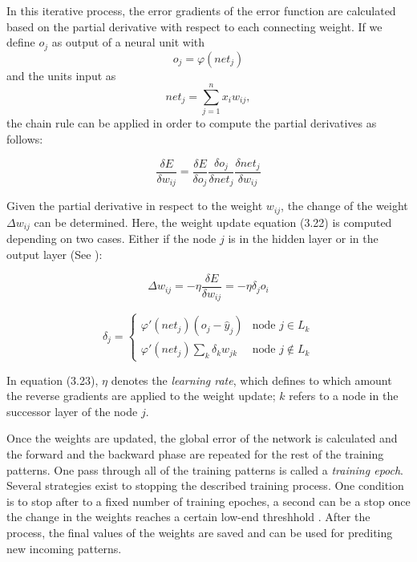 In this iterative process, the error gradients of the error function are calculated based on the partial derivative with respect to each connecting weight. If we define $o_j$ as output of a neural unit with
\begin{equation}
  o_j = \varphi(net_j)
\end{equation}
and the units input as
\begin{equation}
  net_j = \sum_{j=1}^{n}x_{i}w_{ij},
\end{equation}
the chain rule can be applied in order to compute the partial derivatives as follows:

\begin{equation}
  \frac{\delta E}{\delta w_{ij}} = \frac{\delta E}{\delta o_j} \frac{\delta o_j}{\delta net_j} \frac{\delta net_j}{\delta w_{ij}}
\end{equation}

Given the partial derivative in respect to the weight $w_{ij}$, the change of the weight $\Delta w_{ij}$ can be determined. Here, the weight update equation (3.22) is computed depending on two cases. Either if the node $j$ is in the hidden layer or in the output layer (See \cite{Mitchell:1997:ML:541177}):

\begin{equation}
  \Delta w_{ij} = -\eta \frac{\delta E}{\delta w_{ij}} = - \eta \delta_j o_i
\end{equation}

\begin{equation}
  \delta_j =
  \begin{cases}
    \varphi'(net_j)(o_j - \hat{y}_j) & \text{node $j \in L_k$}\\
    \varphi'(net_j) \sum_k \delta_k w_{jk} & \text{node $j \notin L_k$}
  \end{cases}
\end{equation}

In equation (3.23), $\eta$ denotes the \textit{learning rate}, which defines to which amount the reverse gradients are applied to the weight update; $k$ refers to a node in the successor layer of the node $j$.

Once the weights are updated, the global error of the network is calculated and the forward and the backward phase are repeated for the rest of the training patterns. One pass through all of the training patterns is called a \textit{training epoch}. Several strategies exist to stopping the described training process. One condition is to stop after to a fixed number of training epoches, a second can be a stop once the change in the weights reaches a certain low-end threshhold \cite{Haykin:1998:NNC:521706}. After the process, the final values of the weights are saved and can be used for prediting new incoming patterns.

